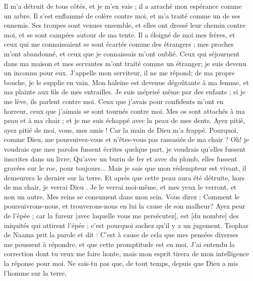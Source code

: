 \begin{multicols}{2}
Il m'a détruit de tous côtés, et je m'en vais ; il a arraché mon espérance comme un arbre.
Il s'est enflammé de colère contre moi, et m'a traité comme un de ses ennemis.
Ses troupes sont venues ensemble, et elles ont dressé leur chemin contre moi, et se sont campées autour de ma tente.
Il a éloigné de moi mes frères, et ceux qui me connaissaient se sont écartés comme des étrangers ;
mes proches m'ont abandonné, et ceux que je connaissais m'ont oublié.
Ceux qui séjournent dans ma maison et mes servantes m'ont traité comme un étranger; je suis devenu un inconnu pour eux. 
J'appelle mon serviteur, il ne me répond; de ma propre bouche, je le supplie en vain. 
Mon haleine est devenue dégoûtante à ma femme, et ma plainte aux fils de mes entrailles.
Je suis méprisé même par des enfants ; si je me lève, ils parlent contre moi.
Ceux que j'avais pour confidents m'ont en horreur, ceux que j'aimais se sont tournés contre moi.
Mes os sont attachés à ma peau et à ma chair ; et je me suis échappé avec la peau de mes dents.
Ayez pitié, ayez pitié de moi, vous, mes amis ! Car la main de Dieu m'a frappé.
Pourquoi, comme Dieu, me poursuivez-vous et n'êtes-vous pas rassasiés de ma chair  ?
Oh! je voudrais que mes paroles fussent écrites quelque part, je voudrais qu'elles fussent inscrites dans un livre; 
Qu'avec un burin de fer et avec du plomb, elles fussent gravées sur le roc, pour toujours... 
Mais je sais que mon rédempteur est vivant, il demeurera le dernier sur la terre.
Et après que cette peau aura été détruite, hors de ma chair, je verrai Dieu .
Je le verrai moi-même, et mes yeux le verront, et non un autre. Mes reins se consument dans mon sein. 
Vous direz : Comment le poursuivrons-nous, et trouverons-nous en lui la cause de son malheur? 
Ayez peur de l'épée ; car la fureur [avec laquelle vous me persécutez], est [du nombre] des iniquités qui attirent l'épée ; c'est pourquoi sachez qu'il y a un jugement. 
\VerseOne{}Tsophar de Naama prit la parole et dit :
C'est à cause de cela que mes pensées diverses me poussent à répondre, et que cette promptitude est en moi. 
J'ai entendu la correction dont tu veux me faire honte, mais mon esprit tirera de mon intelligence la réponse pour moi. 
Ne sais-tu pas que, de tout temps, depuis que Dieu a mis l'homme sur la terre, 

\end{multicols}
